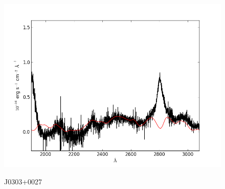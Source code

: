 \documentclass[usenatbib]{mn2e}
\begin{document}
\begin{figure}
\begin{center}
\vspace{5mm}
\includegraphics[width=0.49\linewidth,angle=0]{./red/fe_fit_SBB_6.png}\\

\end{center} 
\caption{J0303+0027 \label{fig:landscape}}   
\end{figure}

\newpage
\end{document}
